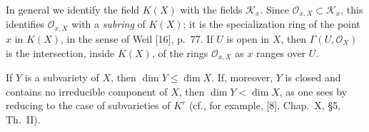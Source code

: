 In general we identify the field $K(X)$ with the fields $\mathcal{K}_x$. Since $\mathcal{O}_{x,X}\subset\mathcal{K}_x$, this identifies $\mathcal{O}_{x,X}$ with a \textit{subring} of $K(X)$; it is the specialization ring of the point $x$ in $K(X)$, in the sense of Weil [16], p.~77. If $U$ is open in $X$, then $\Gamma(U,\mathcal{O}_X)$ is the intersection, inside $K(X)$, of the rings $\mathcal{O}_{x,X}$ as $x$ ranges over $U$.

If $Y$ is a subvariety of $X$, then $\dim Y\leq\dim X$. If, moreover, $Y$ is closed and contains no irreducible component of $X$, then $\dim Y<\dim X$, as one sees by reducing to the case of subvarieties of $K^r$ (cf., for example, [8], Chap.~X, \S5, Th.~II).
